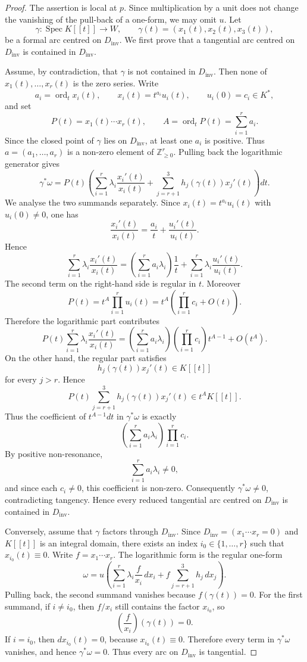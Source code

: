 \documentclass[11pt]{amsart}
\numberwithin{equation}{section}
\theoremstyle{plain}
\theoremstyle{definition}
\newcommand{\Spec}{\operatorname{Spec}}
\newcommand{\ord}{\operatorname{ord}}
\newcommand{\Dinv}{D_{\mathrm{inv}}}
\newcommand{\bZ}{\mathbb Z}
\begin{document}
 
\begin{proof}
The assertion is local at \(p\).  Since multiplication by a unit does not
change the vanishing of the pull-back of a one-form, we may omit \(u\).
Let
\[
\gamma:\Spec K[[t]]\longrightarrow W,
\qquad
\gamma(t)=(x_1(t),x_2(t),x_3(t)),
\]
be a formal arc centred on \(\Dinv\).  We first prove that a tangential arc
centred on \(\Dinv\) is contained in \(\Dinv\).

Assume, by contradiction, that \(\gamma\) is not contained in \(\Dinv\).
Then none of \(x_1(t),\ldots,x_r(t)\) is the zero series.  Write
\[
a_i=\ord_t x_i(t),\qquad
x_i(t)=t^{a_i}u_i(t),
\qquad
u_i(0)=c_i\in K^*,
\]
and set
\[
P(t)=x_1(t)\cdots x_r(t),\qquad
A=\ord_t P(t)=\sum_{i=1}^r a_i .
\]
Since the closed point of \(\gamma\) lies on \(\Dinv\), at least one \(a_i\)
is positive.  Thus \(a=(a_1,\ldots,a_r)\) is a non-zero element of
\(\bZ_{\geq 0}^r\).
Pulling back the logarithmic generator gives
\[
\gamma^*\omega
=
P(t)
\left(
\sum_{i=1}^r\lambda_i\frac{x_i'(t)}{x_i(t)}
+
\sum_{j=r+1}^3 h_j(\gamma(t))x_j'(t)
\right)dt .
\]
We analyse the two summands separately.  Since
\(x_i(t)=t^{a_i}u_i(t)\) with \(u_i(0)\neq0\), one has
\[
\frac{x_i'(t)}{x_i(t)}
=
\frac{a_i}{t}+\frac{u_i'(t)}{u_i(t)}.
\]
Hence
\[
\sum_{i=1}^r\lambda_i\frac{x_i'(t)}{x_i(t)}
=
\left(\sum_{i=1}^r a_i\lambda_i\right)\frac{1}{t}
+
\sum_{i=1}^r\lambda_i\frac{u_i'(t)}{u_i(t)}.
\]
The second term on the right-hand side is regular in \(t\).  Moreover
\[
P(t)
=
t^A\prod_{i=1}^r u_i(t)
=
t^A
\left(
\prod_{i=1}^r c_i+O(t)
\right).
\]
Therefore the logarithmic part contributes
\[
P(t)
\sum_{i=1}^r\lambda_i\frac{x_i'(t)}{x_i(t)}
=
\left(\sum_{i=1}^r a_i\lambda_i\right)
\left(\prod_{i=1}^r c_i\right)t^{A-1}
+
O(t^A).
\]
On the other hand, the regular part satisfies
\[
h_j(\gamma(t))x_j'(t)\in K[[t]]
\]
for every \(j>r\).  Hence
\[
P(t)\sum_{j=r+1}^3 h_j(\gamma(t))x_j'(t)
\in t^A K[[t]].
\]
Thus the coefficient of \(t^{A-1}dt\) in \(\gamma^*\omega\) is exactly
\[
\left(\sum_{i=1}^r a_i\lambda_i\right)
\prod_{i=1}^r c_i .
\]
By positive non-resonance,
\[
\sum_{i=1}^r a_i\lambda_i\neq0,
\]
and since each \(c_i\neq0\), this coefficient is non-zero.  Consequently
\(\gamma^*\omega\neq0\), contradicting tangency.  Hence every reduced
tangential arc centred on \(\Dinv\) is contained in \(\Dinv\).

Conversely, assume that \(\gamma\) factors through \(\Dinv\).  Since
$
\Dinv=(x_1\cdots x_r=0)
$
and \(K[[t]]\) is an integral domain, there exists an index
\(i_0\in\{1,\ldots,r\}\) such that
$
x_{i_0}(t)\equiv0.
$
Write \(f=x_1\cdots x_r\).  The logarithmic form is the regular one-form
\[
\omega
=
u\left(
\sum_{i=1}^r\lambda_i\frac{f}{x_i}\,dx_i
+
f\sum_{j=r+1}^3 h_j\,dx_j
\right).
\]
Pulling back, the second summand vanishes because $
f(\gamma(t))=0.
$
For the first summand, if \(i\neq i_0\), then \(f/x_i\) still contains the
factor \(x_{i_0}\), so
\[
\left(\frac{f}{x_i}\right)(\gamma(t))=0.
\]
If \(i=i_0\), then \(dx_{i_0}(t)=0\), because \(x_{i_0}(t)\equiv0\).
Therefore every term in \(\gamma^*\omega\) vanishes, and hence
$
\gamma^*\omega=0.
$
Thus every arc on \(\Dinv\) is tangential.


\end{proof}
\end{document}
